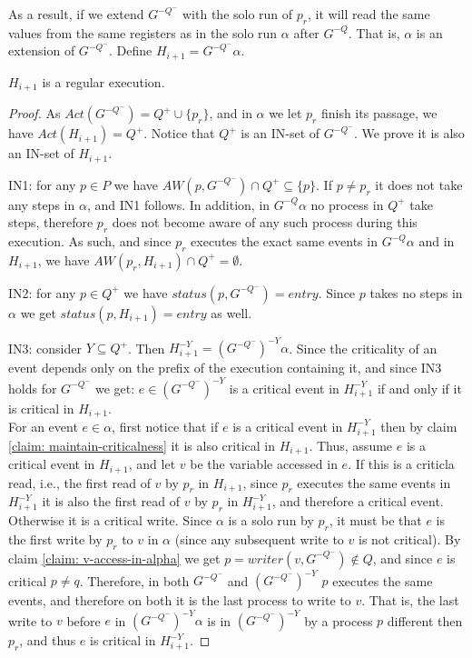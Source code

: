 As a result, if we extend $G^{-Q^-}$ with the solo run of $p_r$, it will read the same values from the same registers as in the solo run $\alpha$ after $G^{-Q}$. That is, $\alpha$ is an extension of $G^{-Q^-}$. Define $H_{i+1} = G^{-Q^-} \alpha$.

\begin{claim-subsection}
	$H_{i+1}$ is a regular execution.
\end{claim-subsection}

\begin{proof}
	
	As $Act(G^{-Q^-}) = Q^+ \cup \{p_r\}$, and in $\alpha$ we let $p_r$ finish its passage, we have $Act(H_{i+1}) = Q^+$. Notice that $Q^+$ is an IN-set of $G^{-Q^-}$. We prove it is also an IN-set of $H_{i+1}$.
	
	IN1: for any $p \in P$ we have $AW(p,G^{-Q^-}) \cap Q^+ \subseteq \{p\}$. If $p \neq p_r$ it does not take any steps in $\alpha$, and IN1 follows. In addition, in $G^{-Q} \alpha$ no process in $Q^+$ take steps, therefore $p_r$ does not become aware of any such process during this execution. As such, and since $p_r$ executes the exact same events in $G^{-Q} \alpha$ and in $H_{i+1}$, we have $AW(p_r, H_{i+1}) \cap Q^+ = \emptyset$.
	
	IN2: for any $p \in Q^+$ we have $status(p,G^{-Q^-}) = entry$. Since $p$ takes no steps in $\alpha$ we get $status(p,H_{i+1}) = entry$ as well.
	
	IN3: consider $Y \subseteq Q^+$. Then $H_{i+1}^{-Y} = (G^{-Q^-})^{-Y} \alpha$. Since the criticality of an event depends only on the prefix of the execution containing it, and since IN3 holds for $G^{-Q^-}$ we get: $e \in (G^{-Q^-})^{-Y}$ is a critical event in $H_{i+1}^{-Y}$ if and only if it is critical in $H_{i+1}$.
	\\ For an event $e \in \alpha$, first notice that if $e$ is a critical event in $H_{i+1}^{-Y}$ then by claim \ref{claim: maintain-criticalness} it is also critical in $H_{i+1}$. Thus, assume $e$ is a critical event in $H_{i+1}$, and let $v$ be the variable accessed in $e$. If this is a criticla read, i.e., the first read of $v$ by $p_r$ in $H_{i+1}$, since $p_r$ executes the same events in $H_{i+1}^{-Y}$ it is also the first read of $v$ by $p_r$ in $H_{i+1}^{-Y}$, and therefore a critical event. Otherwise it is a critical write. Since $\alpha$ is a solo run by $p_r$, it must be that $e$ is the first write by $p_r$ to $v$ in $\alpha$ (since any subsequent write to $v$ is not critical). By claim \ref{claim: v-access-in-alpha} we get $p = writer(v,G^{-Q^-}) \notin Q$, and since $e$ is critical $p \neq q$. Therefore, in both $G^{-Q^-}$ and $(G^{-Q^-})^{-Y}$ $p$ executes the same events, and therefore on both it is the last process to write to $v$. That is, the last write to $v$ before $e$ in $(G^{-Q^-})^{-Y} \alpha$ is in $(G^{-Q^-})^{-Y}$ by a process $p$ different then $p_r$, and thus $e$ is critical in $H_{i+1}^{-Y}$.
	

\end{proof}
